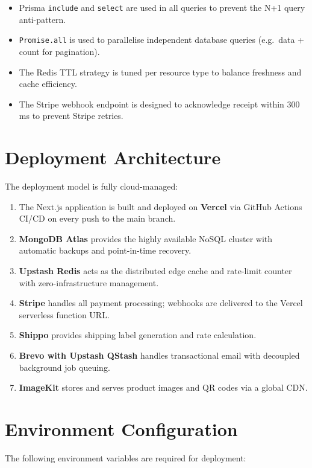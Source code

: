 \documentclass[12pt,a4paper]{report}
\begin{document}
\begin{itemize}
    \item Prisma \texttt{include} and \texttt{select} are used in all queries to prevent the N+1 query anti-pattern.
    \item \texttt{Promise.all} is used to parallelise independent database queries (e.g.\ data + count for pagination).
    \item The Redis TTL strategy is tuned per resource type to balance freshness and cache efficiency.
    \item The Stripe webhook endpoint is designed to acknowledge receipt within 300\,ms to prevent Stripe retries.
\end{itemize}

\section{Deployment Architecture}

The deployment model is fully cloud-managed:
\begin{enumerate}
    \item The Next.js application is built and deployed on \textbf{Vercel} via GitHub Actions CI/CD on every push to the main branch.
    \item \textbf{MongoDB Atlas} provides the highly available NoSQL cluster with automatic backups and point-in-time recovery.
    \item \textbf{Upstash Redis} acts as the distributed edge cache and rate-limit counter with zero-infrastructure management.
    \item \textbf{Stripe} handles all payment processing; webhooks are delivered to the Vercel serverless function URL.
    \item \textbf{Shippo} provides shipping label generation and rate calculation.
    \item \textbf{Brevo with Upstash QStash} handles transactional email with decoupled background job queuing.
    \item \textbf{ImageKit} stores and serves product images and QR codes via a global CDN.
\end{enumerate}

\section{Environment Configuration}

The following environment variables are required for deployment:
\end{document}
